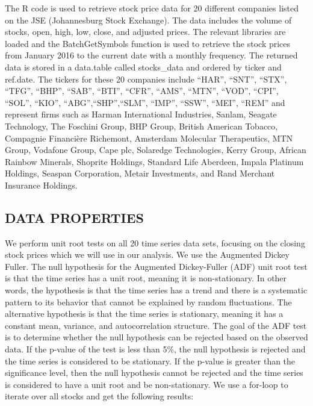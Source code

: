 \documentclass[
]{article}
\begin{document}
The R code is used to retrieve stock price data for 20 different
companies listed on the JSE (Johannesburg Stock Exchange). The data
includes the volume of stocks, open, high, low, close, and adjusted
prices. The relevant libraries are loaded and the BatchGetSymbols
function is used to retrieve the stock prices from January 2016 to the
current date with a monthly frequency. The returned data is stored in a
data.table called stocks\_data and ordered by ticker and ref.date. The
tickers for these 20 companies include ``HAR'', ``SNT'', ``STX'',
``TFG'', ``BHP'', ``SAB'', ``BTI'', ``CFR'', ``AMS'', ``MTN'', ``VOD'',
``CPI'', ``SOL'', ``KIO'', ``ABG'',``SHP'',``SLM'', ``IMP'', ``SSW'',
``MEI'', ``REM'' and represent firms such as Harman International
Industries, Sanlam, Seagate Technology, The Foschini Group, BHP Group,
British American Tobacco, Compagnie Financière Richemont, Amsterdam
Molecular Therapeutics, MTN Group, Vodafone Group, Cape plc, Solaredge
Technologies, Kerry Group, African Rainbow Minerals, Shoprite Holdings,
Standard Life Aberdeen, Impala Platinum Holdings, Seaspan Corporation,
Metair Investments, and Rand Merchant Insurance Holdings.

\hypertarget{data-properties}{%
\subsection{DATA PROPERTIES}\label{data-properties}}

We perform unit root tests on all 20 time series data sets, focusing on
the closing stock prices which we will use in our analysis. We use the
Augmented Dickey Fuller. The null hypothesis for the Augmented
Dickey-Fuller (ADF) unit root test is that the time series has a unit
root, meaning it is non-stationary. In other words, the hypothesis is
that the time series has a trend and there is a systematic pattern to
its behavior that cannot be explained by random fluctuations. The
alternative hypothesis is that the time series is stationary, meaning it
has a constant mean, variance, and autocorrelation structure. The goal
of the ADF test is to determine whether the null hypothesis can be
rejected based on the observed data. If the p-value of the test is less
than 5\%, the null hypothesis is rejected and the time series is
considered to be stationary. If the p-value is greater than the
significance level, then the null hypothesis cannot be rejected and the
time series is considered to have a unit root and be non-stationary. We
use a for-loop to iterate over all stocks and get the following results:
\end{document}
